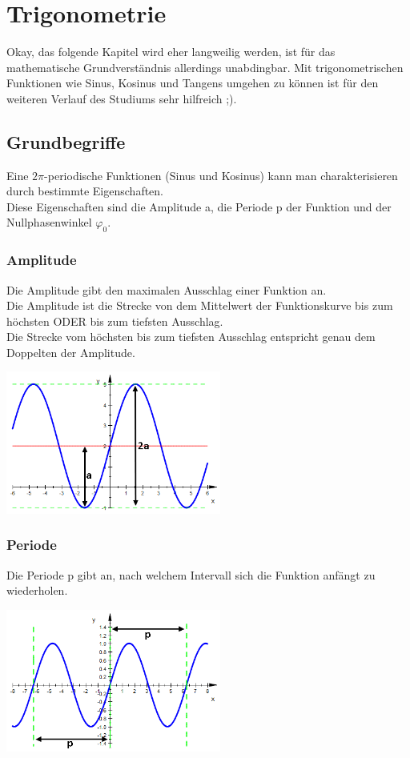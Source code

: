 \documentclass[11pt,final]{scrreprt}
\begin{document}
\chapter{Trigonometrie}
Okay, das folgende Kapitel wird eher langweilig werden, ist für das mathematische Grundverständnis allerdings unabdingbar. Mit trigonometrischen Funktionen wie Sinus, Kosinus und Tangens umgehen zu können ist für den weiteren Verlauf des Studiums sehr hilfreich ;).

\section{Grundbegriffe}
Eine $2\pi$-periodische Funktionen (Sinus und Kosinus) kann man charakterisieren durch bestimmte Eigenschaften.\\
Diese Eigenschaften sind die Amplitude a, die Periode p der Funktion und der Nullphasenwinkel $\varphi_0$.\\

\subsection{Amplitude}
Die Amplitude gibt den maximalen Ausschlag einer Funktion an.\\
Die Amplitude ist die Strecke von dem Mittelwert der Funktionskurve bis zum höchsten ODER bis zum tiefsten Ausschlag.\\
Die Strecke vom höchsten bis zum tiefsten Ausschlag entspricht genau dem Doppelten der Amplitude.
\begin{center}
\includegraphics[width=200pt]{images/amplitude_1}
\end{center}
\subsection{Periode}
Die Periode p gibt an, nach welchem Intervall sich die Funktion anfängt zu wiederholen.
\begin{center}
\includegraphics[width=200pt]{images/amplitude_2}\\
\end{center}
\end{document}

